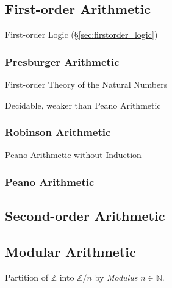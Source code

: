 \subsection{First-order Arithmetic}\label{sec:firstorder_arithmetic}

First-order Logic (\S\ref{sec:firstorder_logic})



\subsubsection{Presburger Arithmetic}\label{sec:presburger_arithmetic}

First-order Theory of the Natural Numbers

Decidable, weaker than Peano Arithmetic



\subsubsection{Robinson Arithmetic}\label{sec:robinson_arithmetic}

Peano Arithmetic without Induction



\subsubsection{Peano Arithmetic}\label{sec:peano_arithmetic}



\subsection{Second-order Arithmetic}\label{sec:second_order_arithmetic}

\subsection{Modular Arithmetic}\label{sec:modular_arithmetic}

Partition of $\mathbb{Z}$ into $\mathbb{Z}/n$ by \emph{Modulus} $n \in
\mathbb{N}$.

